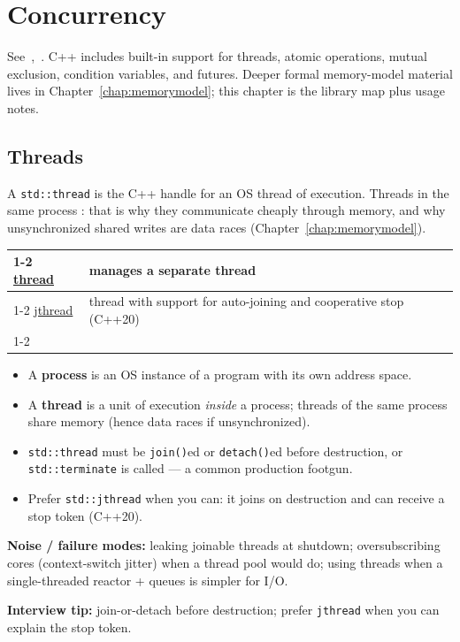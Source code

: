 \chapter{Concurrency}
\label{chap:concurrency}
See~\cite{cppreference-thread},~\cite{cppreference-memory-order}.
\newline
C++ includes built-in support for threads, atomic operations, mutual exclusion, 
condition variables, and futures. Deeper formal memory-model material lives in 
Chapter~\ref{chap:memorymodel}; this chapter is the library map plus usage notes.
\newline
\section{Threads}
\label{sec:threads}
A \texttt{std::thread} is the C++ handle for an OS thread of execution. Threads in the 
same process : that is why they communicate cheaply 
through memory, and why unsynchronized shared writes are data races 
(Chapter~\ref{chap:memorymodel}).
\begin{table}[H]
    \begin{tabularx}{\textwidth}{|l|X|}
        \cline{1-2}
        \href{https://en.cppreference.com/w/cpp/thread/thread}{thread}
        & manages a separate thread \\
        \cline{1-2}
        \href{https://en.cppreference.com/w/cpp/thread/jthread}{jthread} 
        & thread with support for auto-joining and cooperative stop (C++20) \\
        \cline{1-2}   
    \end{tabularx}
\end{table}

\begin{itemize}
    \item A \textbf{process} is an OS instance of a program with its own address space.
    \item A \textbf{thread} is a unit of execution \emph{inside} a process; threads of the 
          same process share memory (hence data races if unsynchronized).
    \item \texttt{std::thread} must be \texttt{join()}ed or \texttt{detach()}ed before 
          destruction, or \texttt{std::terminate} is called --- a common production footgun.
    \item Prefer \texttt{std::jthread} when you can: it joins on destruction and can 
          receive a stop token (C++20).
\end{itemize}
\textbf{Noise / failure modes:} leaking joinable threads at shutdown; oversubscribing 
cores (context-switch jitter) when a thread pool would do; using threads when a 
single-threaded reactor + queues is simpler for I/O.
\par\noindent\textbf{Interview tip:} join-or-detach before destruction; prefer 
\texttt{jthread} when you can explain the stop token.

